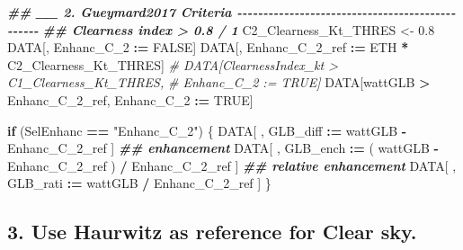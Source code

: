 \documentclass[
  10pt,
  a4paper,oneside]{article}
\newenvironment{Shaded}{\begin{snugshade}}{\end{snugshade}}
\newcommand{\CommentTok}[1]{\textcolor[rgb]{0.56,0.35,0.01}{\textit{#1}}}
\newcommand{\ConstantTok}[1]{\textcolor[rgb]{0.56,0.35,0.01}{#1}}
\newcommand{\ControlFlowTok}[1]{\textcolor[rgb]{0.13,0.29,0.53}{\textbf{#1}}}
\newcommand{\DocumentationTok}[1]{\textcolor[rgb]{0.56,0.35,0.01}{\textbf{\textit{#1}}}}
\newcommand{\FloatTok}[1]{\textcolor[rgb]{0.00,0.00,0.81}{#1}}
\newcommand{\NormalTok}[1]{#1}
\newcommand{\OtherTok}[1]{\textcolor[rgb]{0.56,0.35,0.01}{#1}}
\newcommand{\SpecialCharTok}[1]{\textcolor[rgb]{0.81,0.36,0.00}{\textbf{#1}}}
\newcommand{\StringTok}[1]{\textcolor[rgb]{0.31,0.60,0.02}{#1}}
\begin{document}
\begin{Shaded}
\begin{Highlighting}[]
\DocumentationTok{\#\# \_\_ 2. Gueymard2017 Criteria  {-}{-}{-}{-}{-}{-}{-}{-}{-}{-}{-}{-}{-}{-}{-}{-}{-}{-}{-}{-}{-}{-}{-}{-}{-}{-}{-}{-}{-}{-}{-}{-}{-}{-}{-}{-}{-}{-}{-}{-}{-}{-}{-}{-}{-}{-}{-}{-}}
\DocumentationTok{\#\# Clearness index \textgreater{} 0.8 / 1}
\NormalTok{C2\_Clearness\_Kt\_THRES }\OtherTok{\textless{}{-}} \FloatTok{0.8}
\NormalTok{DATA[, Enhanc\_C\_2 }\SpecialCharTok{:=} \ConstantTok{FALSE}\NormalTok{]}
\NormalTok{DATA[, Enhanc\_C\_2\_ref }\SpecialCharTok{:=}\NormalTok{ ETH }\SpecialCharTok{*}\NormalTok{ C2\_Clearness\_Kt\_THRES]}
\CommentTok{\# DATA[ClearnessIndex\_kt \textgreater{} C1\_Clearness\_Kt\_THRES,}
\CommentTok{\#      Enhanc\_C\_2 := TRUE]}
\NormalTok{DATA[wattGLB }\SpecialCharTok{\textgreater{}}\NormalTok{ Enhanc\_C\_2\_ref,}
\NormalTok{     Enhanc\_C\_2 }\SpecialCharTok{:=} \ConstantTok{TRUE}\NormalTok{]}

\ControlFlowTok{if}\NormalTok{ (SelEnhanc }\SpecialCharTok{==} \StringTok{"Enhanc\_C\_2"}\NormalTok{) \{}
\NormalTok{    DATA[ , GLB\_diff }\SpecialCharTok{:=}\NormalTok{   wattGLB }\SpecialCharTok{{-}}\NormalTok{ Enhanc\_C\_2\_ref                    ] }\DocumentationTok{\#\# enhancement}
\NormalTok{    DATA[ , GLB\_ench }\SpecialCharTok{:=}\NormalTok{ ( wattGLB }\SpecialCharTok{{-}}\NormalTok{ Enhanc\_C\_2\_ref ) }\SpecialCharTok{/}\NormalTok{ Enhanc\_C\_2\_ref ] }\DocumentationTok{\#\# relative enhancement}
\NormalTok{    DATA[ , GLB\_rati }\SpecialCharTok{:=}\NormalTok{   wattGLB }\SpecialCharTok{/}\NormalTok{ Enhanc\_C\_2\_ref                    ]}
\NormalTok{\}}
\end{Highlighting}
\end{Shaded}

\hypertarget{use-haurwitz-as-reference-for-clear-sky.}{%
\subsection{3. Use Haurwitz as reference for Clear sky.}\label{use-haurwitz-as-reference-for-clear-sky.}}
\end{document}
